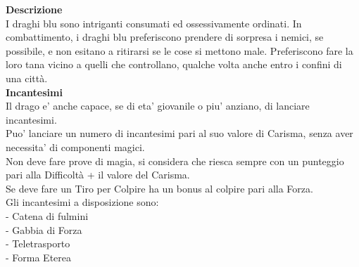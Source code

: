\begin{multicols}{2}
\textbf{Descrizione}\\
I draghi blu sono intriganti consumati ed ossessivamente ordinati. In combattimento, i draghi blu preferiscono prendere di sorpresa i nemici, se possibile, e non esitano a ritirarsi se le cose si mettono male. Preferiscono fare la loro tana vicino a quelli che controllano, qualche volta anche entro i confini di una città.\\
\textbf{Incantesimi}\\
Il drago e' anche capace, se di eta' giovanile o piu' anziano, di lanciare incantesimi.\\
Puo' lanciare un numero di incantesimi pari al suo valore di Carisma, senza aver necessita' di componenti magici.\\
Non deve fare prove di magia, si considera che riesca sempre con un punteggio pari alla Difficoltà + il valore del Carisma.\\
Se deve fare un Tiro per Colpire ha un bonus al colpire pari alla Forza.\\
Gli incantesimi a disposizione sono:\\
- Catena di fulmini\\
- Gabbia di Forza\\
- Teletrasporto\\
- Forma Eterea\\



\end{multicols}
